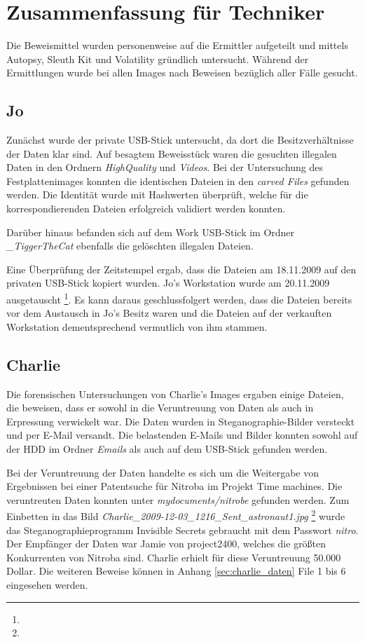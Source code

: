 \chapter{Zusammenfassung für Techniker}
\label{sec:tec}




Die Beweismittel wurden personenweise auf die Ermittler aufgeteilt und mittels Autopsy, Sleuth Kit und Volatility gründlich untersucht. Während der Ermittlungen wurde bei allen Images nach Beweisen bezüglich aller Fälle gesucht.

\section{Jo}
\label{sec:jo}
Zunächst wurde der private USB-Stick untersucht, da dort die Besitzverhältnisse der Daten klar sind. Auf besagtem Beweisstück waren die gesuchten illegalen Daten in den Ordnern \textit{HighQuality} und \textit{Videos}. Bei der Untersuchung des Festplattenimages konnten die identischen Dateien in den \textit{carved Files} gefunden werden. Die Identität wurde mit Hashwerten überprüft, welche für die korrespondierenden Dateien erfolgreich validiert werden konnten.

Darüber hinaus befanden sich auf dem Work USB-Stick im Ordner \textit{_TiggerTheCat} ebenfalls die gelöschten illegalen Dateien.

Eine Überprüfung der Zeitstempel ergab, dass die Dateien am 18.11.2009 auf den privaten USB-Stick kopiert
wurden. Jo's Workstation wurde am 20.11.2009 ausgetauscht \footnote{}. Es kann daraus geschlussfolgert werden, dass die Dateien bereits vor dem Austausch in Jo's Besitz waren und die Dateien auf der verkauften Workstation  dementsprechend vermutlich von ihm stammen.

\section{Charlie}
\label{sec:charlie}
Die forensischen Untersuchungen von Charlie's Images ergaben einige Dateien, die beweisen, dass er sowohl in die Veruntreuung von Daten als auch in Erpressung verwickelt war. Die Daten wurden in Steganographie-Bilder versteckt und per E-Mail versandt. Die belastenden E-Mails und Bilder konnten sowohl auf der HDD im Ordner \textit{Emails} als auch auf dem USB-Stick gefunden werden.

Bei der Veruntreuung der Daten handelte es sich um die Weitergabe von Ergebnissen bei einer Patentsuche für
Nitroba im Projekt Time machines. Die veruntreuten Daten konnten unter \textit{mydocuments/nitrobe} gefunden
werden. Zum Einbetten in das Bild \textit{Charlie_2009-12-03_1216_Sent_astronaut1.jpg}
\footnote{} wurde das Steganographieprogramm Invisible Secrets gebraucht mit dem Passwort \textit{nitro}. Der Empfänger der Daten war Jamie von project2400, welches die größten Konkurrenten von Nitroba sind. Charlie erhielt für diese Veruntreuung 50.000 Dollar. Die weiteren Beweise können in Anhang \ref{sec:charlie_daten} File 1 bis 6 eingesehen werden.

